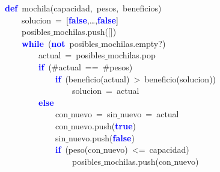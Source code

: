 \noindent
\mbox{}\textbf{\textcolor{Blue}{def}}\ mochila\textcolor{BrickRed}{(}capacidad\textcolor{BrickRed}{,}\ pesos\textcolor{BrickRed}{,}\ beneficios\textcolor{BrickRed}{)} \\
\mbox{}\ \ \ \ solucion\ \textcolor{BrickRed}{=}\ \textcolor{BrickRed}{[}\textbf{\textcolor{Blue}{false}}\textcolor{BrickRed}{,}\dots\textcolor{BrickRed}{,}\textbf{\textcolor{Blue}{false}}\textcolor{BrickRed}{]} \\
\mbox{}\ \ \ \ posibles$\_$mochilas\textcolor{BrickRed}{.}push\textcolor{BrickRed}{([])} \\
\mbox{}\ \ \ \ \textbf{\textcolor{Blue}{while}}\ \textcolor{BrickRed}{(}\textbf{\textcolor{Blue}{not}}\ posibles$\_$mochilas\textcolor{BrickRed}{.}empty?\textcolor{BrickRed}{)} \\
\mbox{}\ \ \ \ \ \ \ \ actual\ \textcolor{BrickRed}{=}\ posibles$\_$mochilas\textcolor{BrickRed}{.}pop \\
\mbox{}\ \ \ \ \ \ \ \ \textbf{\textcolor{Blue}{if}}\ \textcolor{BrickRed}{(}\#actual\ \textcolor{BrickRed}{==}\ \#pesos\textcolor{BrickRed}{)} \\
\mbox{}\ \ \ \ \ \ \ \ \ \ \ \ \textbf{\textcolor{Blue}{if}}\ \textcolor{BrickRed}{(}beneficio\textcolor{BrickRed}{(}actual\textcolor{BrickRed}{)}\ \textcolor{BrickRed}{\textgreater{}}\ beneficio\textcolor{BrickRed}{(}solucion\textcolor{BrickRed}{))} \\
\mbox{}\ \ \ \ \ \ \ \ \ \ \ \ \ \ \ \ solucion\ \textcolor{BrickRed}{=}\ actual \\
\mbox{}\ \ \ \ \ \ \ \ \textbf{\textcolor{Blue}{else}}\  \\
\mbox{}\ \ \ \ \ \ \ \ \ \ \ \ con$\_$nuevo\ \textcolor{BrickRed}{=}\ sin$\_$nuevo\ \textcolor{BrickRed}{=}\ actual \\
\mbox{}\ \ \ \ \ \ \ \ \ \ \ \ con$\_$nuevo\textcolor{BrickRed}{.}push\textcolor{BrickRed}{(}\textbf{\textcolor{Blue}{true}}\textcolor{BrickRed}{)} \\
\mbox{}\ \ \ \ \ \ \ \ \ \ \ \ sin$\_$nuevo\textcolor{BrickRed}{.}push\textcolor{BrickRed}{(}\textbf{\textcolor{Blue}{false}}\textcolor{BrickRed}{)} \\
\mbox{}\ \ \ \ \ \ \ \ \ \ \ \ \textbf{\textcolor{Blue}{if}}\ \textcolor{BrickRed}{(}peso\textcolor{BrickRed}{(}con$\_$nuevo\textcolor{BrickRed}{)}\ \textcolor{BrickRed}{\textless{}=}\ capacidad\textcolor{BrickRed}{)} \\
\mbox{}\ \ \ \ \ \ \ \ \ \ \ \ \ \ \ \ posibles$\_$mochilas\textcolor{BrickRed}{.}push\textcolor{BrickRed}{(}con$\_$nuevo\textcolor{BrickRed}{)} \\
